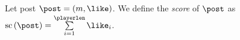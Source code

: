\begin{definition}
  Let post $\post = \left(m, \like\right)$. We define the \emph{score} of
  $\post$ as $\mathrm{sc}\left(\post\right) = \sum\limits_{i = 1}^\playerlen
  \like_i$.
\end{definition}

